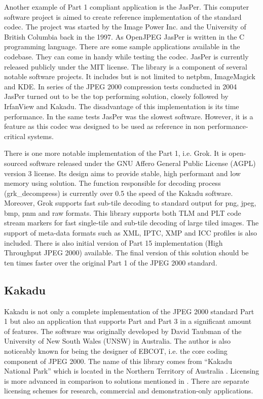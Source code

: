 Another example of Part 1 compliant application is the JasPer. This computer software project is aimed
to create reference implementation of the standard codec. The project was started by the Image Power Inc.
and the University of British Columbia back in the 1997. As OpenJPEG JasPer is written in the C programming language.
There are some sample applications available in the codebase. They can come in handy while testing the codec. 
JasPer is currently released publicly under the MIT license. The library is a component of several notable
software projects. It includes but is not limited to netpbm, ImageMagick and KDE. In series of the JPEG 2000
compression tests conducted in 2004 JasPer turned out to be the top performing solution, closely followed by
IrfanView and Kakadu. The disadvantage of this implementation is its time performance. In the same tests
JasPer was the slowest software. However, it is a feature as this codec was designed to be used as reference
in non performance-critical systems.

There is one more notable implementation of the Part 1, i.e. Grok. It is open-sourced software released under
the GNU Affero General Public License (AGPL) version 3 license. Its design aims to provide stable, high
performant and low memory using solution. The function responsible for decoding process (grk\_decompress)
is currently over 0.5 the speed of the Kakadu software. Moreover, Grok supports fast sub-tile decoding
to standard output for png, jpeg, bmp, pnm and raw formats. This library supports both TLM and PLT code stream markers
for fast single-tile and sub-tile decoding of large tiled images. The support of meta-data formats such as
XML, IPTC, XMP and ICC profiles is also included. There is also initial version of Part 15 implementation
(High Throughput JPEG 2000) available. The final version of this solution should be ten times faster over
the original Part 1 of the JPEG 2000 standard.

\subsection{Kakadu}

Kakadu is not only a complete implementation of the JPEG 2000 standard Part 1 but also an application
that supports Part and Part 3 in a significant amount of features. The software was originally developed
by David Taubman of the University of New South Wales (UNSW) in Australia. The author is also noticeably
known for being the designer of EBCOT, i.e. the core coding component of JPEG 2000. The name of this library
comes from ``Kakadu National Park'' which is located in the Northern Territory of Australia \cite{jpeg_suite}. Licensing
is more advanced in comparison to solutions mentioned in . There are separate licensing
schemes for research, commercial and demonstration-only applications.

